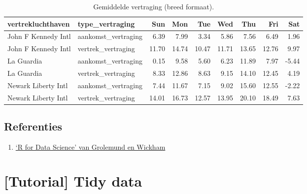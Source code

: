 \documentclass[]{tufte-book}
\newenvironment{Shaded}{}{}
\newcommand{\DataTypeTok}[1]{\textcolor[rgb]{0.56,0.13,0.00}{#1}}
\newcommand{\KeywordTok}[1]{\textcolor[rgb]{0.00,0.44,0.13}{\textbf{#1}}}
\newcommand{\NormalTok}[1]{#1}
\newcommand{\OperatorTok}[1]{\textcolor[rgb]{0.40,0.40,0.40}{#1}}
\newcommand{\StringTok}[1]{\textcolor[rgb]{0.25,0.44,0.63}{#1}}
\providecommand{\tightlist}{%
  \setlength{\itemsep}{0pt}\setlength{\parskip}{0pt}}
\begin{document}
\begin{Shaded}
\end{Shaded}

\begin{table}

\caption{\label{tab:7-15b}Gemiddelde vertraging (breed formaat).}
\centering
\fontsize{10}{12}\selectfont
\begin{tabular}[t]{llrrrrrrr}
\toprule
vertrekluchthaven & type\_vertraging & Sun & Mon & Tue & Wed & Thu & Fri & Sat\\
\midrule
John F Kennedy Intl & aankomst\_vertraging & 6.39 & 7.99 & 3.34 & 5.86 & 7.56 & 6.49 & 1.96\\
John F Kennedy Intl & vertrek\_vertraging & 11.70 & 14.74 & 10.47 & 11.71 & 13.65 & 12.76 & 9.97\\
La Guardia & aankomst\_vertraging & 0.15 & 9.58 & 5.60 & 6.23 & 11.89 & 7.97 & -5.44\\
La Guardia & vertrek\_vertraging & 8.33 & 12.86 & 8.63 & 9.15 & 14.10 & 12.45 & 4.19\\
Newark Liberty Intl & aankomst\_vertraging & 7.44 & 11.67 & 7.15 & 9.02 & 15.60 & 12.55 & -2.22\\
\addlinespace
Newark Liberty Intl & vertrek\_vertraging & 14.01 & 16.73 & 12.57 & 13.95 & 20.10 & 18.49 & 7.63\\
\bottomrule
\end{tabular}
\end{table}

\hypertarget{referenties-4}{%
\section{Referenties}\label{referenties-4}}

\begin{enumerate}
\def\labelenumi{\arabic{enumi}.}
\tightlist
\item
  \href{http://r4ds.had.co.nz/}{`R for Data Science' van Grolemund en Wickham}
\end{enumerate}

\hypertarget{tutorial-tidy-data}{%
\chapter{{[}Tutorial{]} Tidy data}\label{tutorial-tidy-data}}
\end{document}
